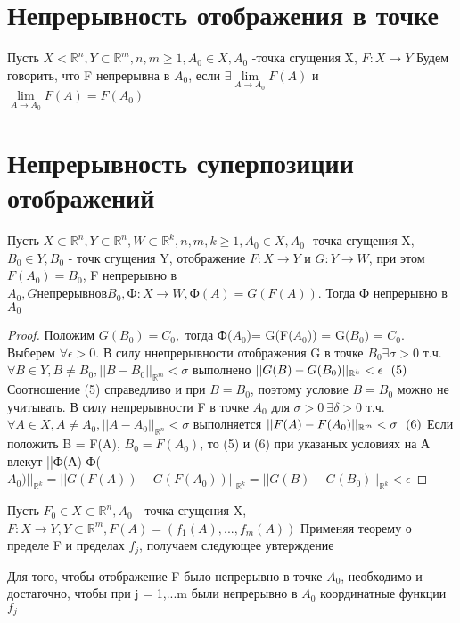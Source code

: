 \section{Непрерывность отображения в точке}
\begin{definition}
	Пусть $X < \mathbb{R}^n, Y \subset \mathbb{R}^m, n,m \geq 1, A_0 \in X, A_0$ -точка сгущения X, $F: X \to Y$ Будем говорить, что F непрерывна в $A_0$, если $\exists \lim\limits_{A \to A_0}{F(A)}$ и $\lim\limits_{A \to A_0}{F(A)} = F(A_0)$
\end{definition}
\section{Непрерывность суперпозиции отображений}
\begin{theorem}
	Пусть $X \subset \mathbb{R}^n, Y \subset \mathbb{R}^n, W \subset \mathbb{R}^k, n,m,k \geq 1, A_0 \in X, A_0$ -точка сгущения X, $B_0 \in Y, B_0$ - точк сгущения Y, отображение $F: X \to Y$ и $G: Y \to W$, при этом $F(A_0) = B_0$, F непрерывно в $A_0, G непрерывно в B_0, \text{Ф}:X \to W, \text{Ф}(A) = G(F(A)).$ Тогда Ф непрерывно в $A_0$
\end{theorem}
\begin{proof}
	Положим $G(B_0) = C_0,$ тогда Ф($A_0$)= G(F($A_0$)) = G($B_0$) = $C_0$. Выберем $\forall \epsilon > 0.$ В силу ннепрерывности отображения G в точке $B_0 \exists \sigma > 0$ т.ч. $\forall B \in Y, B \neq B_0, ||B - B_0||_{\mathbb{R}^m} < \sigma$ выполнено $||G(B)-G(B_0)||_{\mathbb{R}^k}< \epsilon \ \ (5) \\$
	Соотношение (5) справедливо и при $B = B_0$, поэтому условие $B = B_0$ можно не учитывать. В силу непрерывности F в точке $A_0$ для $\sigma > 0 \ \exists \delta > 0$ т.ч. $\forall A \in X, A\neq A_0,||A-A_0||_{\mathbb{R}^n} < \sigma$ выполняется $||F(A)-F(A_0)||_{\mathbb{R}^m} < \sigma \ \ (6) \\$
	Если положить B = F(A), $B_0 = F(A_0)$, то (5) и (6) при указаных условиях на А влекут ||Ф(А)-Ф($A_0)||_{\mathbb{R}^k} = ||G(F(A))-G(F(A_0))||_{\mathbb{R}^k} = ||G(B)-G(B_0)||_{\mathbb{R}^k}< \epsilon$
\end{proof} 
Пусть $F_0 \in X \subset \mathbb{R}^n,A_0$ - точка сгущения X, $F: X \to Y, Y \subset \mathbb{R}^m, F(A) = (f_1(A),...,f_m(A))$ Применяя теорему о пределе F и пределах $f_j$, получаем следующее увтерждение
\begin{theorem}
Для того, чтобы отображение F было непрерывно в точке $A_0$, необходимо и достаточно, чтобы при j = 1,...m были непрерывно в $A_0$ координатные функции $f_j$
\end{theorem}
